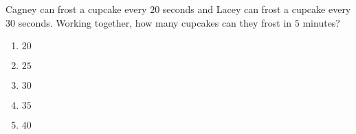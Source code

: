 Cagney can frost a cupcake every $20$ seconds and Lacey can frost a cupcake every $30$ seconds. Working together, how many cupcakes can they frost in $5$ minutes?
\begin{enumerate}
\item $20$
\item $25$
\item $30$
\item $35$
\item $40$
\end{enumerate}
